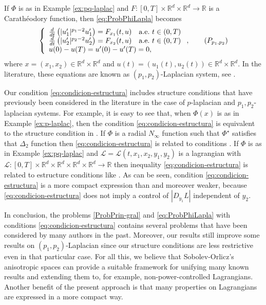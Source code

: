 \documentclass[twoside]{article}
\theoremstyle{remark}
\newcounter{example}[section]
\newcommand{\rr}{\mathbb{R}}
\begin{document}
If $\Phi$ is as in Example \ref{ex:pq-laplac} and  $F:[0,T]\times\rr^d\times\rr^d\to\rr$ is a Carath\'eodory function, then \eqref{eq:ProbPhiLapla} becomes
\begin{equation}\label{eq:sist-p_lapa}
    \left\{%
\begin{array}{ll}
  \frac{d}{dt}\left(|u_1'|^{p_1-2}u_1'\right)=F_{x_1}(t,u) \quad \hbox{a.e.}\ t \in (0,T)\\
  \frac{d}{dt}\left(|u_2'|^{p_2-2}u_2'\right)=F_{x_2}(t,u) \quad \hbox{a.e.}\ t \in (0,T)\\
   u(0)-u(T)=u'(0)-u'(T)=0,
\end{array}%
\right., \tag{${P_{p_1,p_2}}$}
\end{equation}
where $x=(x_1,x_2)\in\rr^d\times\rr^d$ and $u(t)=(u_1(t),u_2(t))\in\rr^d\times\rr^d$. In the literature, these equations are known as $(p_1,p_2)$-Laplacian system, see
\cite{li2014periodic,pasca2010periodic,pacsca2010some,pasca2011some,pasca2016periodic,yang2012periodic,yang2013existence}.


Our condition \eqref{eq:condicion-estructura} includes structure conditions that have previously been considered in the literature in the case of $p$-laplacian and $p_1,p_2$-laplacian systems. For example, it is easy to see that, when $\Phi(x)$ is as in Example \ref{ex:p-laplac}, then  the condition \eqref{eq:condicion-estructura}  is equivalent to the structure condition in  \cite[Th. 1.4]{mawhin2010critical}.  If $\Phi$ is a radial $N_{\infty}$ function such that $\Phi^{\star}$ satisfies that $\Delta_2$ function  then \eqref{eq:condicion-estructura} is related to conditions  \cite[Eq. (2)-(4)]{ABGMS2015}.   If $\Phi$ is as in Example \ref{ex:pq-laplac} and $\mathcal{L}=\mathcal{L}(t,x_1,x_2,y_1,y_2)$ is a lagrangian with $\mathcal{L}:[0,T]\times\rr^d\times\rr^d\times\rr^d\times\rr^d\to\rr$ then inequality \eqref{eq:condicion-estructura} is related to estructure conditions like
\cite[Lemma 3.1, Eq. (3.1)]{Tian2007192}. As can be seen, condition \eqref{eq:condicion-estructura} is a more compact expression than \cite[Lemma 3.1, Eq. (3.1)]{Tian2007192} and moreover   weaker, because  \eqref{eq:condicion-estructura} does not imply a control of
$|D_{y_1}L|$ independent of $y_2$. 


In conclusion, the problems \eqref{ProbPrin-gral} and \eqref{eq:ProbPhiLapla} with conditions \eqref{eq:condicion-estructura}  contains several problems that have been considered by many authors in the past. 
Moreover, our results still improve some results on $(p_1,p_2)$-Laplacian since our structure conditions are less restrictive even in that particular case.  
For all this, we believe that Sobolev-Orlicz's anisotropic spaces can provide a suitable framework for unifying many known results and extending them to, for example, non-power-controlled Lagrangians. Another benefit of the present approach is that many properties on Lagrangians are expressed in a more compact way. 
\end{document}

